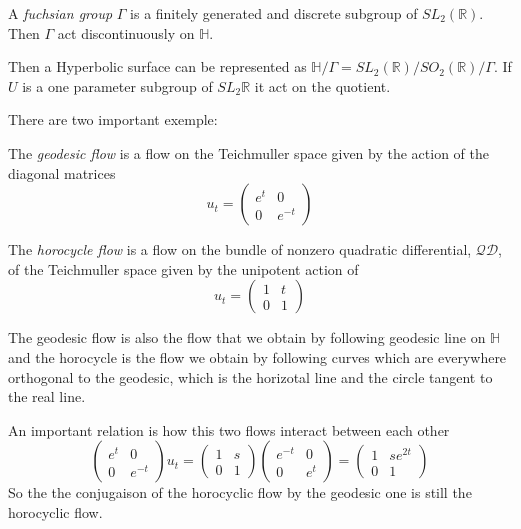 \begin{dfnt}
A \emph{fuchsian group} $\Gamma$ is a finitely generated and discrete subgroup of $SL_2(\mathbb{R})$. Then $\Gamma$ act discontinuously on $\mathbb{H}$.
\end{dfnt}

Then a Hyperbolic surface can be represented as $\mathbb{H}/ \Gamma = SL_2(\mathbb{R}) / SO_2(\mathbb{R}) / \Gamma$. If $U$ is a one parameter subgroup of $SL_2{\mathbb{R}}$ it act on the quotient.

There are two important exemple:

\begin{dfnt}
The \emph{geodesic flow} is a flow on the Teichmuller space given by the action of the diagonal matrices\[
u_t=\begin{pmatrix}
e^t & 0 \\
0 & e^{-t}
\end{pmatrix}
\]
\end{dfnt}

\begin{dfnt}
The \emph{horocycle flow} is a flow on the bundle of nonzero quadratic differential, $\mathcal{QD}$, of the Teichmuller space given by the unipotent action of \[
u_t=\begin{pmatrix}
1 & t \\
0 & 1
\end{pmatrix}
\]
\end{dfnt}

The geodesic flow is also the flow that we obtain by following geodesic line on $\mathbb{H}$ and the horocycle is the flow we obtain by following curves which are everywhere orthogonal to the geodesic, which is the horizotal line and the circle tangent to the real line.





An important relation is how this two flows interact between each other \[
\begin{pmatrix} e^t & 0 \\ 0 & e^{-t}\end{pmatrix} u_t=\begin{pmatrix} 1 & s \\ 0 & 1 \end{pmatrix} \begin{pmatrix} e^{-t} & 0 \\ 0 & e^{t}\end{pmatrix}=
\begin{pmatrix} 1 & s e^{2t} \\ 0 & 1\end{pmatrix}
\]
So the the conjugaison of the horocyclic flow by the geodesic one is still the horocyclic flow.

